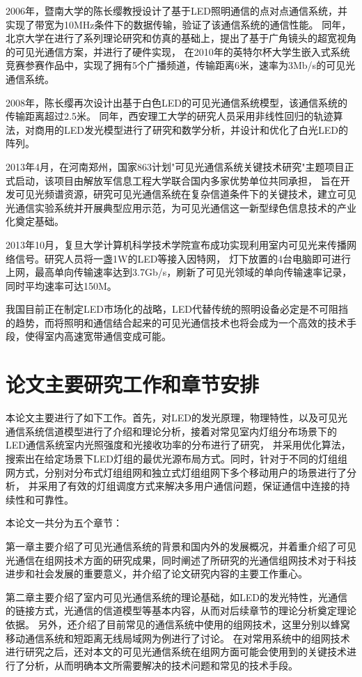 2006年，暨南大学的陈长缨教授设计了基于LED照明通信的点对点通信系统，并实现了带宽为10MHz条件下的数据传输，验证了该通信系统的通信性能\cite{hu2006}。
同年，北京大学在进行了系列理论研究和仿真的基础上，提出了基于广角镜头的超宽视角的可见光通信方案，并进行了硬件实现，
在2010年的英特尔杯大学生嵌入式系统竞赛参赛作品中，实现了拥有5个广播频道，传输距离6米，速率为3Mb/s的可见光通信系统\cite{ChenTe2013}。

2008年，陈长缨再次设计出基于白色LED的可见光通信系统模型，该通信系统的传输距离超过2.5米。
同年，西安理工大学的研究人员采用非线性回归的轨迹算法，对商用的LED发光模型进行了研究和数学分析，并设计和优化了白光LED的阵列\cite{Ding2010}。

2013年4月，在河南郑州，国家863计划"可见光通信系统关键技术研究"主题项目正式启动，该项目由解放军信息工程大学联合国内多家优势单位共同承担，
旨在开发可见光频谱资源，研究可见光通信系统在复杂信道条件下的关键技术，建立可见光通信实验系统并开展典型应用示范，为可见光通信这一新型绿色信息技术的产业化奠定基础\cite{VlcProject}。

2013年10月，复旦大学计算机科学技术学院宣布成功实现利用室内可见光来传播网络信号。研究人员将一盏1W的LED等接入因特网，
灯下放置的4台电脑即可进行上网，最高单向传输速率达到3.7Gb/s，刷新了可见光领域的单向传输速率记录，同时平均速率可达150M\cite{Lifi}。

我国目前正在制定LED市场化的战略，LED代替传统的照明设备必定是不可阻挡的趋势，而将照明和通信结合起来的可见光通信技术也将会成为一个高效的技术手段，使得室内高速宽带通信变成可能。


\section{论文主要研究工作和章节安排}\label{sec:concept}
本论文主要进行了如下工作。首先，对LED的发光原理，物理特性，以及可见光通信系统信道模型进行了介绍和理论分析，接着对常见室内灯组分布场景下的LED通信系统室内光照强度和光接收功率的分布进行了研究，
并采用优化算法，搜索出在给定场景下LED灯组的最优光源布局方式。同时，针对于不同的灯组组网方式，分别对分布式灯组组网和独立式灯组组网下多个移动用户的场景进行了分析，
并采用了有效的灯组调度方式来解决多用户通信问题，保证通信中连接的持续性和可靠性。

本论文一共分为五个章节：

第一章主要介绍了可见光通信系统的背景和国内外的发展概况，并着重介绍了可见光通信在组网技术方面的研究成果，同时阐述了所研究的光通信组网技术对于科技进步和社会发展的重要意义，并介绍了论文研究内容的主要工作重心。

第二章主要介绍了室内可见光通信系统的理论基础，如LED的发光特性，光通信的链接方式，光通信的信道模型等基本内容，从而对后续章节的理论分析奠定理论依据。
另外，还介绍了目前常见的通信系统中使用的组网技术，这里分别以蜂窝移动通信系统和短距离无线局域网为例进行了讨论。
在对常用系统中的组网技术进行研究之后，还对本文的可见光通信系统在组网方面可能会使用到的关键技术进行了分析，从而明确本文所需要解决的技术问题和常见的技术手段。

